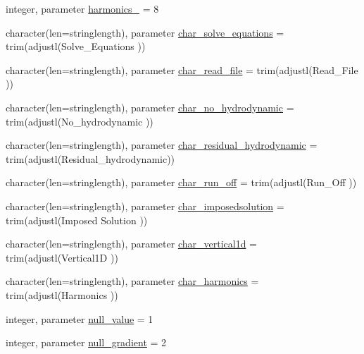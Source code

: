\begin{DoxyCompactItemize}
\item 
integer, parameter \mbox{\hyperlink{namespacemodulehydrodynamic_a2a1d1197dc5c88ac8bf0ba967de08f81}{harmonics\+\_\+}} = 8
\item 
character(len=stringlength), parameter \mbox{\hyperlink{namespacemodulehydrodynamic_ad779cdc3636c017857bfb215293de5f9}{char\+\_\+solve\+\_\+equations}} = trim(adjustl(\textquotesingle{}Solve\+\_\+\+Equations\textquotesingle{} ))
\item 
character(len=stringlength), parameter \mbox{\hyperlink{namespacemodulehydrodynamic_a712275d1c62e5a85f4d398124d404651}{char\+\_\+read\+\_\+file}} = trim(adjustl(\textquotesingle{}Read\+\_\+\+File\textquotesingle{} ))
\item 
character(len=stringlength), parameter \mbox{\hyperlink{namespacemodulehydrodynamic_a4e8da1a28740ccba137f2ec1d40baac0}{char\+\_\+no\+\_\+hydrodynamic}} = trim(adjustl(\textquotesingle{}No\+\_\+hydrodynamic\textquotesingle{} ))
\item 
character(len=stringlength), parameter \mbox{\hyperlink{namespacemodulehydrodynamic_acb43993cccbfd0ba35d82ee368adf6fa}{char\+\_\+residual\+\_\+hydrodynamic}} = trim(adjustl(\textquotesingle{}Residual\+\_\+hydrodynamic\textquotesingle{}))
\item 
character(len=stringlength), parameter \mbox{\hyperlink{namespacemodulehydrodynamic_a594066c996ad89ed64e21d2401d31c92}{char\+\_\+run\+\_\+off}} = trim(adjustl(\textquotesingle{}Run\+\_\+\+Off\textquotesingle{} ))
\item 
character(len=stringlength), parameter \mbox{\hyperlink{namespacemodulehydrodynamic_a78cbfa7a6a863ae98d98b01e0ee6d7ae}{char\+\_\+imposedsolution}} = trim(adjustl(\textquotesingle{}Imposed Solution\textquotesingle{} ))
\item 
character(len=stringlength), parameter \mbox{\hyperlink{namespacemodulehydrodynamic_a2ea04eb9dae051db35d06bfca08f3814}{char\+\_\+vertical1d}} = trim(adjustl(\textquotesingle{}Vertical1D\textquotesingle{} ))
\item 
character(len=stringlength), parameter \mbox{\hyperlink{namespacemodulehydrodynamic_a67dadb80ec9687942a901acc6fb202af}{char\+\_\+harmonics}} = trim(adjustl(\textquotesingle{}Harmonics\textquotesingle{} ))
\item 
integer, parameter \mbox{\hyperlink{namespacemodulehydrodynamic_a49aaf47fd883f68b02770ba74b7e1851}{null\+\_\+value}} = 1
\item 
integer, parameter \mbox{\hyperlink{namespacemodulehydrodynamic_a6421eb8c0ace0ea4db3925349c646611}{null\+\_\+gradient}} = 2

\end{DoxyCompactItemize}
